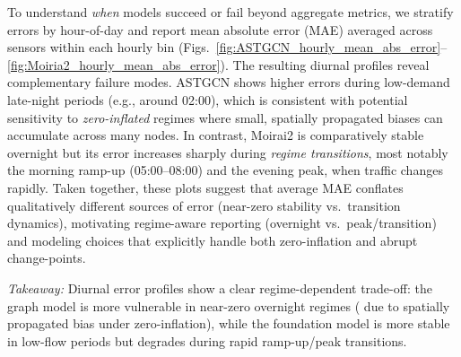 \documentclass[10pt]{article}
\begin{document}
To understand \emph{when} models succeed or fail beyond aggregate metrics, we stratify errors by hour-of-day
and report mean absolute error (MAE) averaged across sensors within each hourly bin
(Figs.~\ref{fig:ASTGCN_hourly_mean_abs_error}--\ref{fig:Moiria2_hourly_mean_abs_error}).
The resulting diurnal profiles reveal complementary failure modes. ASTGCN shows higher errors during
low-demand late-night periods (e.g., around 02:00), which is consistent with potential sensitivity to
\emph{zero-inflated} regimes where small, spatially propagated biases can accumulate across many nodes.
In contrast, Moirai2 is comparatively stable overnight but its error increases sharply during
\emph{regime transitions}, most notably the morning ramp-up (05:00--08:00) and the evening peak, when traffic
changes rapidly. Taken together, these plots suggest that average MAE conflates qualitatively different sources of error (near-zero stability vs.\ transition dynamics), motivating regime-aware reporting (overnight vs.\ peak/transition)
and modeling choices that explicitly handle both zero-inflation and abrupt change-points.
\begin{keydiscovery1}
    \textit{Takeaway:}
Diurnal error profiles show a clear regime-dependent trade-off: the graph model  is more vulnerable in
near-zero overnight regimes ( due to spatially propagated bias under zero-inflation), while the foundation
model is more stable in low-flow periods but degrades during rapid ramp-up/peak transitions. %
\end{keydiscovery1}






\end{document}
